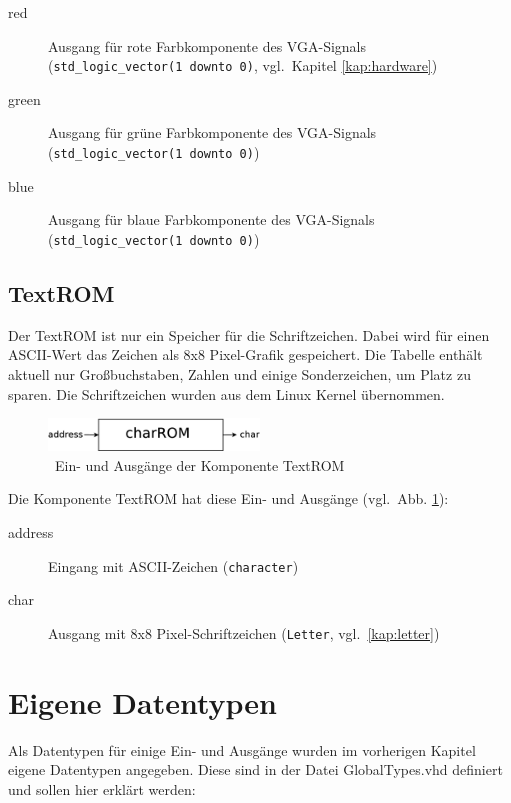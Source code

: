\documentclass[IN,ngerman,utf8,12pt]{tumbook}
\newcommand{\vgl}{vgl.\ }
\begin{document}
\begin{description}
    \item[red] Ausgang für rote Farbkomponente des VGA-Signals \\
        (\texttt{std\_logic\_vector(1 downto 0)}, \vgl Kapitel \ref{kap:hardware})
    \item[green] Ausgang für grüne Farbkomponente des VGA-Signals \\
        (\texttt{std\_logic\_vector(1 downto 0)})
    \item[blue] Ausgang für blaue Farbkomponente des VGA-Signals \\
        (\texttt{std\_logic\_vector(1 downto 0)})
\end{description}

\subsection{TextROM}

Der TextROM ist nur ein Speicher für die Schriftzeichen.
Dabei wird für einen ASCII-Wert das Zeichen als 8x8 Pixel-Grafik gespeichert.
Die Tabelle enthält aktuell nur Großbuchstaben, Zahlen und einige Sonderzeichen, um Platz zu sparen.
Die Schriftzeichen wurden aus dem Linux Kernel übernommen.

\begin{figure}[H]
    \centerline{
        \includegraphics[width=0.5\textwidth]{img/textROM}
    }
    \label{abb:textrom}
    \caption{\ Ein- und Ausgänge der Komponente TextROM}
\end{figure}

Die Komponente TextROM hat diese Ein- und Ausgänge (\vgl Abb. \ref{abb:textrom}):
\begin{description}
    \item[address] Eingang mit ASCII-Zeichen (\texttt{character})
    \item[char] Ausgang mit 8x8 Pixel-Schriftzeichen (\texttt{Letter}, \vgl \ref{kap:letter})
\end{description}

\section{Eigene Datentypen}
Als Datentypen für einige Ein- und Ausgänge wurden im vorherigen Kapitel eigene Datentypen angegeben.
Diese sind in der Datei GlobalTypes.vhd definiert und sollen hier erklärt werden:
\end{document}
